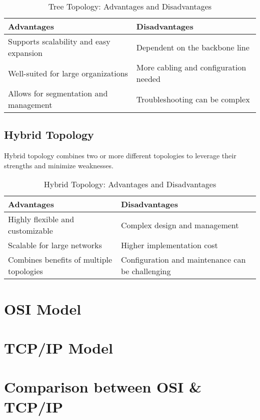 \begin{table}[H]
\centering
\caption{Tree Topology: Advantages and Disadvantages}
\begin{tabularx}{\linewidth}{|X|X|}
\hline
\textbf{Advantages} & \textbf{Disadvantages} \\
\hline
Supports scalability and easy expansion & Dependent on the backbone line \\
\hline
Well-suited for large organizations & More cabling and configuration needed \\
\hline
Allows for segmentation and management & Troubleshooting can be complex \\
\hline
\end{tabularx}
\end{table}

\subsection{Hybrid Topology}
Hybrid topology combines two or more different topologies to leverage their strengths and minimize weaknesses.

\begin{table}[H]
\centering
\caption{Hybrid Topology: Advantages and Disadvantages}
\begin{tabularx}{\linewidth}{|X|X|}
\hline
\textbf{Advantages} & \textbf{Disadvantages} \\
\hline
Highly flexible and customizable & Complex design and management \\
\hline
Scalable for large networks & Higher implementation cost \\
\hline
Combines benefits of multiple topologies & Configuration and maintenance can be challenging \\
\hline
\end{tabularx}
\end{table}

\section{OSI Model}


\section{TCP/IP Model}

\section{Comparison between OSI \& TCP/IP}